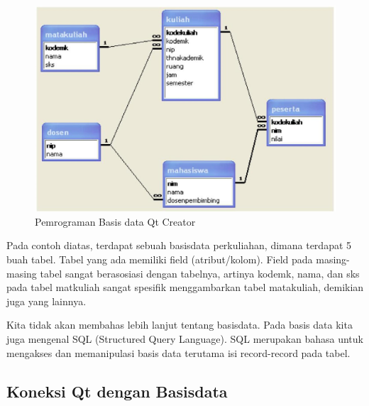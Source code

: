 \begin{figure}
\centering
\includegraphics[width=0.7\linewidth]{../manuscript/images/basis-data-qt}
\caption{Pemrograman Basis data Qt Creator}
\label{fig:basis-data-qt}
\end{figure}


Pada contoh diatas, terdapat sebuah basisdata perkuliahan, dimana
terdapat 5 buah tabel. Tabel yang ada memiliki field (atribut/kolom).
Field pada masing-masing tabel sangat berasosiasi dengan tabelnya,
artinya kodemk, nama, dan sks pada tabel matkuliah sangat spesifik
menggambarkan tabel matakuliah, demikian juga yang lainnya.

Kita tidak akan membahas lebih lanjut tentang basisdata. Pada basis data
kita juga mengenal SQL (Structured Query Language). SQL merupakan bahasa
untuk mengakses dan memanipulasi basis data terutama isi record-record
pada tabel.

\subsection{Koneksi Qt dengan Basisdata}\label{koneksi-qt-dengan-basisdata}

